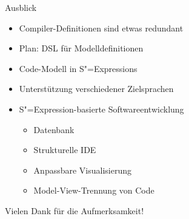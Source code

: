 \documentclass{beamer}
\newcommand{\pfeil}{\item[$\Rightarrow$]}
\newcommand{\sexp}{S"=Expression}
\newcommand{\sexps}{S"=Expressions}
\begin{document}
\begin{frame}{Ausblick}
  \begin{itemize}
  \item Compiler-Definitionen sind etwas redundant
    \pfeil Plan: DSL für Modelldefinitionen
  \item Code-Modell in \sexps{}
  \item Unterstützung verschiedener Zielsprachen
  \item \sexp{}-basierte Softwareentwicklung
    \begin{itemize}
    \item Datenbank
    \item Strukturelle IDE
    \item Anpassbare Visualisierung
    \pfeil Model-View-Trennung von Code
    \end{itemize}
  \end{itemize}
\end{frame}

\begin{frame}
  \begin{center}
    \Huge Vielen Dank für die Aufmerksamkeit!
  \end{center}
\end{frame}
\end{document}
